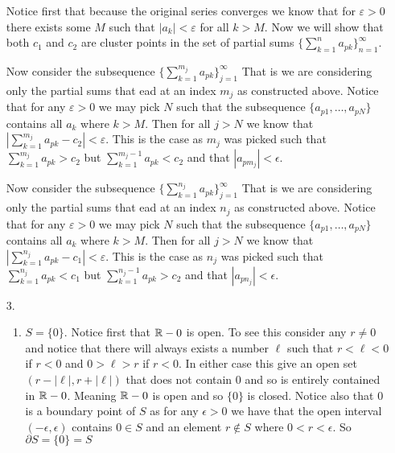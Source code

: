\documentclass[12pt]{amsart}
\begin{document}
\begin{itemize}
        Notice first that because the original series converges we know that for
        $\varepsilon>0$ there exists some $M$ such that $|a_k|<\varepsilon$ for all
        $k>M$. Now we will show that both $c_1$ and $c_2$ are cluster points in the set
        of partial sums $\{\sum_{k=1}^{n}{a_{pk}}\}_{n=1}^{\infty}$.

        Now consider the subsequence $\{\sum_{k=1}^{m_j}{a_{pk}}\}_{j=1}^{\infty}$ That
        is we are considering only the partial sums that ead at an index $m_j$ as
        constructed above. Notice that for any $\varepsilon>0$ we may pick $N$ such
        that the subsequence $\{a_{p1},\dots,a_{pN}\}$ contains all $a_k$ where
        $k>M$. Then for all $j>N$ we know that
        $|\sum_{k=1}^{m_j}{a_{pk}}-c_2|<\varepsilon$. This is the case as $m_j$ was
        picked such that $\sum_{k=1}^{m_j}{a_{pk}}>c_2$ but
        $\sum_{k=1}^{m_j-1}{a_{pk}}<c_2$ and that $|a_{p{m_j}}|<\epsilon$.

        Now consider the subsequence $\{\sum_{k=1}^{n_j}{a_{pk}}\}_{j=1}^{\infty}$ That
        is we are considering only the partial sums that ead at an index $n_j$ as
        constructed above. Notice that for any $\varepsilon>0$ we may pick $N$ such
        that the subsequence $\{a_{p1},\dots,a_{pN}\}$ contains all $a_k$ where
        $k>M$. Then for all $j>N$ we know that
        $|\sum_{k=1}^{n_j}{a_{pk}}-c_1|<\varepsilon$. This is the case as $n_j$ was
        picked such that $\sum_{k=1}^{n_j}{a_{pk}}<c_1$ but
        $\sum_{k=1}^{n_j-1}{a_{pk}}>c_2$ and that $|a_{p{n_j}}|<\epsilon$.

    \item[3.] \begin{enumerate}
            \item $S=\{0\}$. Notice first that $\mathbb{R}-0$ is open. To see this consider any $r\neq 0$ and notice that
                  there will always exists a number $\ell$ such that $r<\ell< 0$ if $r<0$ and $0>\ell>r$ if $r<0$.
                  In either case this give an open set
                  $(r-|\ell|, r+|\ell|)$ that does not contain $0$ and so is entirely
                  contained in $\mathbb{R}-0$. Meaning $\mathbb{R}-0$ is open and so $\{0\}$ is closed.
                  Notice also that $0$ is a boundary point of $S$ as for any $\epsilon>0$ we have that the open interval
                  $(-\epsilon,\epsilon)$ contains $0\in S$ and an element $r\not\in S$ where $0<r<\epsilon$.
                  So $\partial S =\{0\}=S$


\end{enumerate}
\end{itemize}
\end{document}
